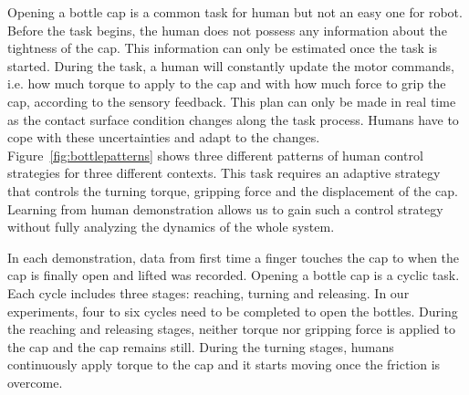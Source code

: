 
Opening a bottle cap is a common task for human but not an easy one
for robot. Before the task begins, the human does not possess any
information about the tightness of the cap. This information can only
be estimated once the task is started.  During the task, a human will
constantly update the motor commands, i.e. how much torque to apply to
the cap and with how much force to grip the cap, according to the
sensory feedback. This plan can only be made in real time as the
contact surface condition changes along the task process.  Humans have
to cope with these uncertainties and adapt to the
changes. Figure~\ref{fig:bottlepatterns} shows three different
patterns of human control strategies for three different
contexts. This task requires an adaptive strategy that controls the
turning torque, gripping force and the displacement of the
cap. Learning from human demonstration allows us to gain such a
control strategy without fully analyzing the dynamics of the whole
system. %


In each demonstration, data from first time a finger touches the cap
to when the cap is finally open and lifted was recorded. Opening a
bottle cap is a cyclic task. Each cycle includes three stages:
reaching, turning and releasing. In our experiments, four to six
cycles need to be completed to open the bottles. During the reaching
and releasing stages, neither torque nor gripping force is applied to the
cap and the cap remains still. During the turning stages, humans
continuously apply torque to the cap and it starts moving once the
friction is overcome.

